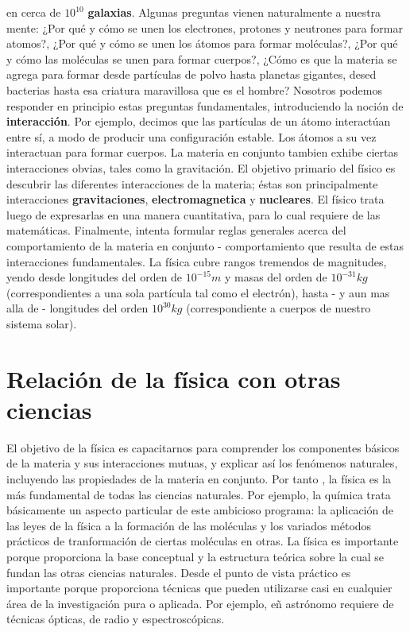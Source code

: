 \documentclass[12pt,a4paper]{book}
\begin{document}
    en cerca de $10^{10}$ \textbf{galaxias}. Algunas preguntas vienen naturalmente a nuestra mente: ¿Por qué y cómo se unen los electrones, protones y neutrones
    para formar atomos?, ¿Por qué y cómo se unen los átomos para formar moléculas?, ¿Por qué y cómo las moléculas se unen para formar cuerpos?, ¿Cómo es que la materia
    se agrega para formar desde partículas de polvo hasta planetas gigantes, desed bacterias hasta esa criatura maravillosa que es el hombre? Nosotros podemos
    responder en principio estas preguntas fundamentales, introduciendo la noción de \textbf{interacción}. Por ejemplo, decimos que las partículas de un átomo
    interactúan entre sí, a modo de producir una configuración estable. Los átomos a su vez interactuan para formar cuerpos. La materia en conjunto tambien exhibe
    ciertas interacciones obvias, tales como la gravitación. El objetivo primario del físico es descubrir las diferentes interacciones de la materia; éstas son
    principalmente interacciones \textbf{gravitaciones}, \textbf{electromagnetica} y \textbf{nucleares}. El físico trata luego de expresarlas en una manera
    cuantitativa, para lo cual requiere de las matemáticas. Finalmente, intenta formular reglas generales acerca del comportamiento de la materia en conjunto -
    comportamiento que resulta de estas interacciones fundamentales. La física cubre rangos tremendos de magnitudes, yendo desde longitudes del orden de
    $10^{-15}m$ y masas del orden de $10^{-31}kg$ (correspondientes a una sola partícula tal como el electrón), hasta - y aun mas alla de - longitudes del
    orden $10^{30}kg$ (correspondiente a cuerpos de nuestro sistema solar).

    \section{Relación de la física con otras ciencias}

    El objetivo de la física es capacitarnos para comprender los componentes básicos de la materia y sus interacciones mutuas, y explicar así los fenómenos naturales,
    incluyendo las propiedades de la materia en conjunto. Por tanto , la física es la más fundamental de todas las ciencias naturales. Por ejemplo, la química trata
    básicamente un aspecto particular de este ambicioso programa: la aplicación de las leyes de la física a la formación de las moléculas y los variados métodos
    prácticos de tranformación de ciertas moléculas en otras. La física es importante porque proporciona la base conceptual y la estructura teórica sobre la cual
    se fundan las otras ciencias naturales. Desde el punto de vista práctico es importante porque proporciona técnicas que pueden utilizarse casi en cualquier
    área de la investigación pura o aplicada. Por ejemplo, eñ astrónomo requiere de técnicas ópticas, de radio y espectroscópicas.
\end{document}
